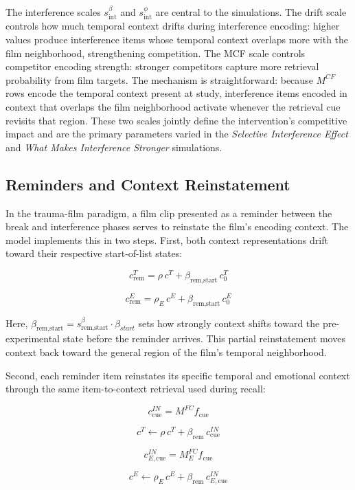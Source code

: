 \documentclass[
  man,
  floatsintext,
  longtable,
  nolmodern,
  notxfonts,
  notimes,
  draftfirst,
  colorlinks=true,linkcolor=blue,citecolor=blue,urlcolor=blue]{apa7}
\begin{document}
The interference scales \(s^{\beta}_\text{int}\) and
\(s^{\phi}_\text{int}\) are central to the simulations. The drift scale
controls how much temporal context drifts during interference encoding:
higher values produce interference items whose temporal context overlaps
more with the film neighborhood, strengthening competition. The MCF
scale controls competitor encoding strength: stronger competitors
capture more retrieval probability from film targets. The mechanism is
straightforward: because \(M^{CF}\) rows encode the temporal context
present at study, interference items encoded in context that overlaps
the film neighborhood activate whenever the retrieval cue revisits that
region. These two scales jointly define the intervention's competitive
impact and are the primary parameters varied in the \emph{Selective
Interference Effect} and \emph{What Makes Interference Stronger}
simulations.

\subsection{Reminders and Context
Reinstatement}\label{reminders-and-context-reinstatement}

In the trauma-film paradigm, a film clip presented as a reminder between
the break and interference phases serves to reinstate the film's
encoding context. The model implements this in two steps. First, both
context representations drift toward their respective start-of-list
states:

\[
c^T_\text{rem} = \rho \, c^T + \beta_\text{rem,start} \, c^T_0
\]

\[
c^E_\text{rem} = \rho_E \, c^E + \beta_\text{rem,start} \, c^E_0
\]

Here,
\(\beta_\text{rem,start} = s^{\beta}_\text{rem,start} \cdot \beta_{start}\)
sets how strongly context shifts toward the pre-experimental state
before the reminder arrives. This partial reinstatement moves context
back toward the general region of the film's temporal neighborhood.

Second, each reminder item reinstates its specific temporal and
emotional context through the same item-to-context retrieval used during
recall:

\[
c^{IN}_\text{cue} = M^{FC} f_\text{cue}
\]

\[
c^T \leftarrow \rho \, c^T + \beta_\text{rem} \, c^{IN}_\text{cue}
\]

\[
c^{IN}_{E,\text{cue}} = M^{FC}_E f_\text{cue}
\]

\[
c^E \leftarrow \rho_E \, c^E + \beta_\text{rem} \, c^{IN}_{E,\text{cue}}
\]
\end{document}
